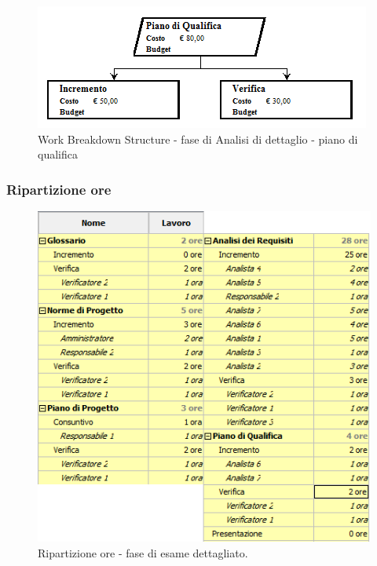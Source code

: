 \documentclass[a4paper]{article}
\begin{document}
				\begin{figure}[H]
					\centering
					\includegraphics[width=\textwidth]{wbs/wbs_dettaglio_5}
					\caption{Work Breakdown Structure - fase di Analisi di dettaglio - piano di qualifica}
				\end{figure}
			\subsubsection{Ripartizione ore}
				\begin{figure}[H]
					\centering
					\includegraphics[width=\textwidth]{ro_dettaglio}
					\caption{Ripartizione ore - fase di esame dettagliato.}
				\end{figure}
				
\end{document}
